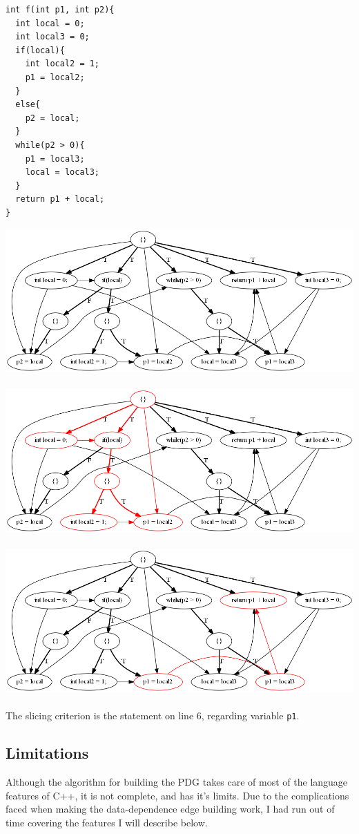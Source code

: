 \documentclass[oneside,12pt,a4paper]{book}
\begin{document}
\begin{lstlisting}
int f(int p1, int p2){
  int local = 0;
  int local3 = 0;
  if(local){
    int local2 = 1;
    p1 = local2;
  }
  else{
    p2 = local;
  }
  while(p2 > 0){
    p1 = local3;
    local = local3;
  }
  return p1 + local;
}
\end{lstlisting}

\includegraphics[width=1.1\textwidth]{cica}
\\
\\
\includegraphics[width=1.1\textwidth]{cica_backward_slice}
\\
\\
\includegraphics[width=1.1\textwidth]{cica_forward_slice}
\\
\\
The slicing criterion is the statement on line 6, regarding variable \texttt{p1}.

\subsection{Limitations}
Although the algorithm for building the PDG takes care of most of the language features of C++, it is not complete, and has it's limits. Due to the complications faced when making the data-dependence edge building work, I had run out of time covering the features I will describe below.
\end{document}

